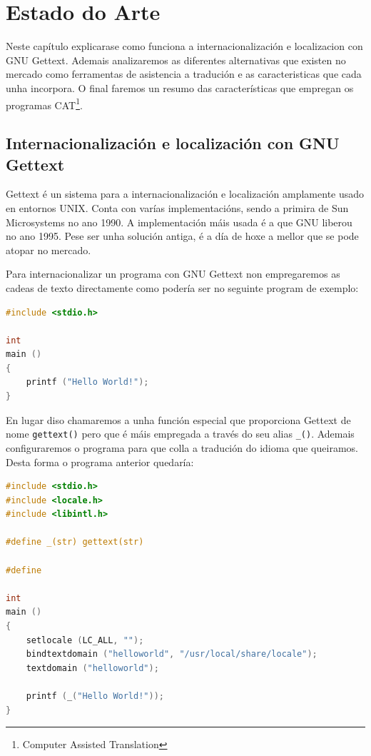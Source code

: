 \chapter[Estado do arte]{Estado do Arte\label{estado_do_arte}}

Neste capítulo explicarase como funciona a internacionalización e localizacion con GNU Gettext. Ademais analizaremos as diferentes alternativas que existen no mercado como ferramentas de asistencia a tradución e as caracteristicas que cada unha incorpora. O final faremos un resumo das características que empregan os programas CAT\footnote{Computer Assisted Translation}.

\section{Internacionalización e localización con GNU Gettext}
Gettext é un sistema para a internacionalización e localización amplamente usado en entornos UNIX. Conta con varías implementacións, sendo a primira de Sun Microsystems no ano 1990. A implementación máis usada é a que GNU liberou no ano 1995. Pese ser unha solución antiga, é a día de hoxe a mellor que se pode atopar no mercado.

Para internacionalizar un programa con GNU Gettext non empregaremos as cadeas de texto directamente como podería ser no seguinte program de exemplo:

\begin{lstlisting}[language=C,label=some-code,caption=helloworld.c (Sen Internacionalizar)]
#include <stdio.h>

int
main ()
{
    printf ("Hello World!");
}
\end{lstlisting}

En lugar diso chamaremos a unha función especial que proporciona Gettext de nome \lstinline{gettext()} pero que é máis empregada a través do seu alias \lstinline{_()}. Ademais configuraremos o programa para que colla a tradución do idioma que queiramos. Desta forma o programa anterior quedaría:

\begin{lstlisting}[language=C,label=some-code,caption=helloworld.c]
#include <stdio.h>
#include <locale.h>
#include <libintl.h>

#define _(str) gettext(str)

#define

int
main ()
{
    setlocale (LC_ALL, "");
    bindtextdomain ("helloworld", "/usr/local/share/locale");
    textdomain ("helloworld");

    printf (_("Hello World!"));
}
\end{lstlisting}

